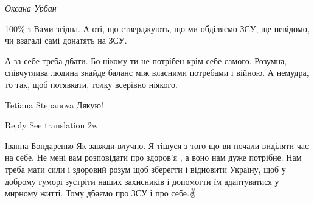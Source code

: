 \emph{Оксана Урбан}

100\% з Вами згідна. А оті, що стверджують, що ми обділяємо ЗСУ, ще невідомо, чи взагалі самі донатять на ЗСУ.

А за себе треба дбати. Бо нікому ти не потрібен крім себе самого. Розумна,
співчутлива людина знайде баланс між власними потребами і війною. А немудра, то
так, щоб потявкати, толку всерівно ніякого.

Tetiana Stepanova
Дякую!

    Reply
    See translation
    2w

Іванна Бондаренко
Як завжди влучно. Я тішуся з того що ви почали виділяти час на себе. Не мені вам розповідати про здоров'я , а воно нам дуже потрібне. Нам треба мати сили і здоровий розум щоб зберегти і відновити Україну, щоб у доброму гуморі зустріти наших захисників і допомогти їм адаптуватися у мирному житті. Тому дбаємо про ЗСУ і про себе.✌️🙏💙💛
